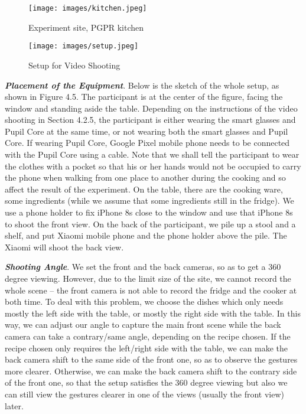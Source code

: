 \documentclass[fyp]{socreport}
\begin{document}
\begin{figure}[H]
\caption{Experiment site, PGPR kitchen}
\centering
\texttt{[image: images/kitchen.jpeg]}
\end{figure}

\begin{figure}[H]
\caption{Setup for Video Shooting}
\centering
\texttt{[image: images/setup.jpeg]}
\end{figure} 

\textbf{\textit{Placement of the Equipment}}. Below is the sketch of the whole setup, as shown in Figure 4.5. The participant is at the center of the figure, facing the window and standing aside the table. Depending on the instructions of the video shooting in Section 4.2.5, the participant is either wearing the smart glasses and Pupil Core at the same time, or not wearing both the smart glasses and Pupil Core. If wearing Pupil Core, Google Pixel mobile phone needs to be connected with the Pupil Core using a cable. Note that we shall tell the participant to wear the clothes with a pocket so that his or her hands would not be occupied to carry the phone when walking from one place to another during the cooking and so affect the result of the experiment. On the table, there are the cooking ware, some ingredients (while we assume that some ingredients still in the fridge). We use a phone holder to fix iPhone 8s close to the window and use that iPhone 8s to shoot the front view. On the back of the participant, we pile up a stool and a shelf, and put Xiaomi mobile phone and the phone holder above the pile. The Xiaomi will shoot the back view.

\textbf{\textit{Shooting Angle}}. We set the front and the back cameras, so as to get a 360 degree viewing. However, due to the limit size of the site, we cannot record the whole scene -- the front camera is not able to record the fridge and the cooker at both time. To deal with this problem, we choose the dishes which only needs mostly the left side with the table, or mostly the right side with the table. In this way, we can adjust our angle to capture the main front scene while the back camera can take a contrary/same angle, depending on the recipe chosen. If the recipe chosen only requires the left/right side with the table, we can make the back camera shift to the same side of the front one, so as to observe the gestures more clearer. Otherwise, we can make the back camera shift to the contrary side of the front one, so that the setup satisfies the 360 degree viewing but also we can still view the gestures clearer in one of the views (usually the front view) later.
\end{document}
